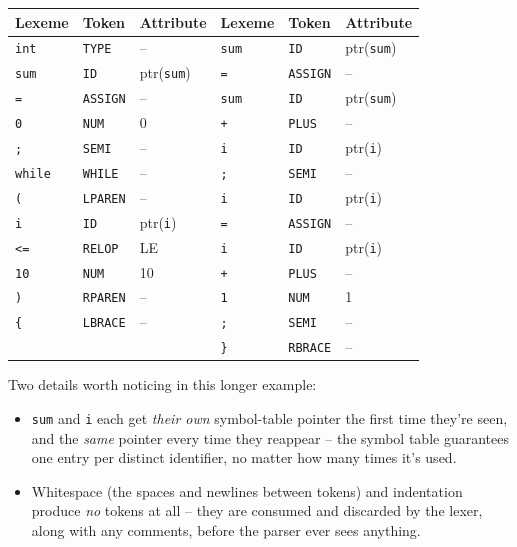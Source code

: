 \documentclass[full-course-notes.tex]{subfiles}
\begin{document}
\begin{center}
\renewcommand{\arraystretch}{1.15}
\footnotesize
\begin{tabularx}{\textwidth}{@{}l l X | l l X@{}}
\toprule
\textbf{Lexeme} & \textbf{Token} & \textbf{Attribute} & \textbf{Lexeme} & \textbf{Token} & \textbf{Attribute} \\
\midrule
\texttt{int} & \texttt{TYPE} & -- & \texttt{sum} & \texttt{ID} & ptr(\texttt{sum}) \\
\texttt{sum} & \texttt{ID} & ptr(\texttt{sum}) & \texttt{=} & \texttt{ASSIGN} & -- \\
\texttt{=} & \texttt{ASSIGN} & -- & \texttt{sum} & \texttt{ID} & ptr(\texttt{sum}) \\
\texttt{0} & \texttt{NUM} & 0 & \texttt{+} & \texttt{PLUS} & -- \\
\texttt{;} & \texttt{SEMI} & -- & \texttt{i} & \texttt{ID} & ptr(\texttt{i}) \\
\texttt{while} & \texttt{WHILE} & -- & \texttt{;} & \texttt{SEMI} & -- \\
\texttt{(} & \texttt{LPAREN} & -- & \texttt{i} & \texttt{ID} & ptr(\texttt{i}) \\
\texttt{i} & \texttt{ID} & ptr(\texttt{i}) & \texttt{=} & \texttt{ASSIGN} & -- \\
\texttt{<=} & \texttt{RELOP} & LE & \texttt{i} & \texttt{ID} & ptr(\texttt{i}) \\
\texttt{10} & \texttt{NUM} & 10 & \texttt{+} & \texttt{PLUS} & -- \\
\texttt{)} & \texttt{RPAREN} & -- & \texttt{1} & \texttt{NUM} & 1 \\
\texttt{\{} & \texttt{LBRACE} & -- & \texttt{;} & \texttt{SEMI} & -- \\
 & & & \texttt{\}} & \texttt{RBRACE} & -- \\
\bottomrule
\end{tabularx}
\end{center}

Two details worth noticing in this longer example:
\begin{itemize}
  \item \texttt{sum} and \texttt{i} each get \emph{their own} symbol-table pointer the first
  time they're seen, and the \emph{same} pointer every time they reappear -- the symbol table
  guarantees one entry per distinct identifier, no matter how many times it's used.
  \item Whitespace (the spaces and newlines between tokens) and indentation produce \emph{no}
  tokens at all -- they are consumed and discarded by the lexer, along with any comments, before
  the parser ever sees anything.
\end{itemize}
\end{document}

